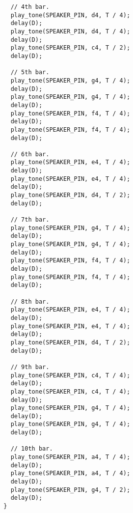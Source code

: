 \documentclass[../sparc.tex]{subfiles}
\begin{document}
\begin{verbatim}
    // 4th bar.
    play_tone(SPEAKER_PIN, d4, T / 4);
    delay(D);
    play_tone(SPEAKER_PIN, d4, T / 4);
    delay(D);
    play_tone(SPEAKER_PIN, c4, T / 2);
    delay(D);

    // 5th bar.
    play_tone(SPEAKER_PIN, g4, T / 4);
    delay(D);
    play_tone(SPEAKER_PIN, g4, T / 4);
    delay(D);
    play_tone(SPEAKER_PIN, f4, T / 4);
    delay(D);
    play_tone(SPEAKER_PIN, f4, T / 4);
    delay(D);

    // 6th bar.
    play_tone(SPEAKER_PIN, e4, T / 4);
    delay(D);
    play_tone(SPEAKER_PIN, e4, T / 4);
    delay(D);
    play_tone(SPEAKER_PIN, d4, T / 2);
    delay(D);

    // 7th bar.
    play_tone(SPEAKER_PIN, g4, T / 4);
    delay(D);
    play_tone(SPEAKER_PIN, g4, T / 4);
    delay(D);
    play_tone(SPEAKER_PIN, f4, T / 4);
    delay(D);
    play_tone(SPEAKER_PIN, f4, T / 4);
    delay(D);

    // 8th bar.
    play_tone(SPEAKER_PIN, e4, T / 4);
    delay(D);
    play_tone(SPEAKER_PIN, e4, T / 4);
    delay(D);
    play_tone(SPEAKER_PIN, d4, T / 2);
    delay(D);

    // 9th bar.
    play_tone(SPEAKER_PIN, c4, T / 4);
    delay(D);
    play_tone(SPEAKER_PIN, c4, T / 4);
    delay(D);
    play_tone(SPEAKER_PIN, g4, T / 4);
    delay(D);
    play_tone(SPEAKER_PIN, g4, T / 4);
    delay(D);

    // 10th bar.
    play_tone(SPEAKER_PIN, a4, T / 4);
    delay(D);
    play_tone(SPEAKER_PIN, a4, T / 4);
    delay(D);
    play_tone(SPEAKER_PIN, g4, T / 2);
    delay(D);
  }
\end{verbatim}
\end{document}

